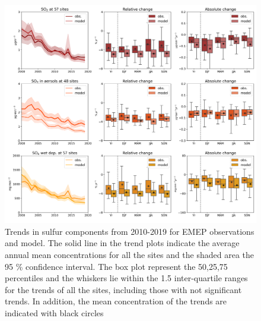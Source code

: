 \begin{figure}
	\centering
	\includegraphics[width=0.74\paperwidth]{FIGS_TRENDS/sulfur_trends.png}
	\caption{\label{fig:SOx_trends}Trends in sulfur components from 2010-2019 for EMEP observations and model. The solid line in the trend plots indicate the average annual mean concentrations for all the sites and the shaded area the 95 \% confidence interval. The box plot represent the 50,25,75 percentiles and the whiskers lie within the 1.5 inter-quartile ranges for the trends of all the sites, including those with not significant trends. In addition, the mean concentration of the trends are indicated with black circles}
\end{figure}

